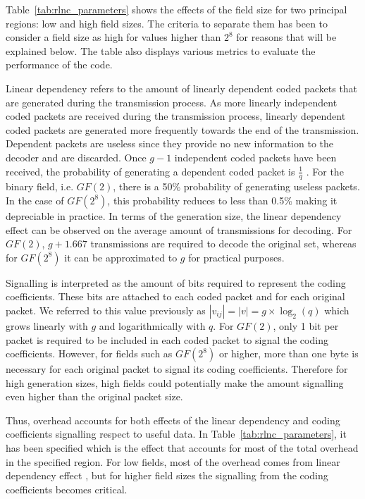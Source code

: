 Table~\ref{tab:rlnc_parameters} shows the effects of the field size for two principal regions: low and high field sizes. The criteria to separate them has been to consider a field size as high for values higher than $2^8$ for reasons that will be explained below. The table also displays various metrics to evaluate the performance of the code.

Linear dependency refers to the amount of linearly dependent coded packets that are generated during the transmission process. As more linearly independent coded packets are received during the transmission process, linearly dependent coded packets are generated more frequently towards the end of the transmission. Dependent packets are useless since they provide no new information to the decoder and are discarded. Once $g - 1$ independent coded packets have been received, the probability of generating a dependent coded packet is $\frac{1}{q}$ \cite{lucani2009random,heide2011code}. For the binary field, i.e. $GF(2)$, there is a 50\% probability of generating useless packets. In the case of $GF(2^8)$, this probability reduces to less than 0.5\% making it depreciable in practice. In terms of the generation size, the linear dependency effect can be observed on the average amount of transmissions for decoding. For $GF(2)$, $g + 1.667$ transmissions are required to decode the original set, whereas for $GF(2^8)$ it can be approximated to $g$ for practical purposes. 

Signalling is interpreted as the amount of bits required to represent the coding coefficients. These bits are attached to each coded packet and for each original packet. We referred to this value previously as $|v_{ij}| = |v| = g \times \log_{2}(q)$ which grows linearly with $g$ and logarithmically with $q$. For $GF(2)$, only 1 bit per packet is required to be included in each coded packet to signal the coding coefficients. However, for fields such as $GF(2^8)$ or higher, more than one byte is necessary for each original packet to signal its coding coefficients. Therefore for high generation sizes, high fields could potentially make the amount signalling even higher than the original packet size.

Thus, overhead accounts for both effects of the linear dependency and coding coefficients signalling respect to useful data. In Table~\ref{tab:rlnc_parameters}, it has been specified which is the effect that accounts for most of the total overhead in the specified region. For low fields, most of the overhead comes from linear dependency effect , but for higher field sizes the signalling from the coding coefficients becomes critical. 

